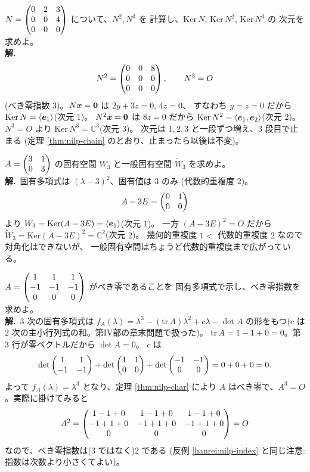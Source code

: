 \begin{rei}[例題・基本(核の増大列)]\label{rei:nilp-chain-ex}
$N = \begin{pmatrix}0 & 2 & 3 \\ 0 & 0 & 4 \\ 0 & 0 & 0\end{pmatrix}$ について、$N^2, N^3$ を
計算し、$\mathrm{Ker}\,N$, $\mathrm{Ker}\,N^2$, $\mathrm{Ker}\,N^3$ の
次元を求めよ。\\
\textbf{解.}\
\[
N^2 = \begin{pmatrix}0 & 0 & 8 \\ 0 & 0 & 0 \\ 0 & 0 & 0\end{pmatrix}, \qquad N^3 = O
\]
(べき零指数 $3$)。$N\bm{x} = \bm{0}$ は $2y + 3z = 0$, $4z = 0$、
すなわち $y = z = 0$ だから
$\mathrm{Ker}\,N = \langle \bm{e}_1 \rangle$(次元 $1$)。
$N^2\bm{x} = \bm{0}$ は $8z = 0$ だから
$\mathrm{Ker}\,N^2 = \langle \bm{e}_1, \bm{e}_2 \rangle$(次元 $2$)。
$N^3 = O$ より $\mathrm{Ker}\,N^3 = \mathbb{C}^3$(次元 $3$)。
次元は $1, 2, 3$ と一段ずつ増え、$3$ 段目で止まる
(定理 \ref{thm:nilp-chain} のとおり、止まったら以後は不変)。
\end{rei}

\begin{rei}[例題・基本(一般固有空間の計算)]\label{rei:nilp-gen2}
$A = \begin{pmatrix}3 & 1 \\ 0 & 3\end{pmatrix}$ の固有空間 $W_3$ と一般固有空間
$\widetilde{W}_3$ を求めよ。\\
\textbf{解.}\ 固有多項式は $(\lambda - 3)^2$、固有値は $3$ のみ
(代数的重複度 $2$)。
\[
A - 3E = \begin{pmatrix}0 & 1 \\ 0 & 0\end{pmatrix}
\]
より $W_3 = \mathrm{Ker}(A - 3E) = \langle \bm{e}_1 \rangle$(次元 $1$)。
一方 $(A - 3E)^2 = O$ だから
$\widetilde{W}_3 = \mathrm{Ker}(A - 3E)^2 = \mathbb{C}^2$(次元 $2$)。
幾何的重複度 $1 <$ 代数的重複度 $2$ なので対角化はできないが、
一般固有空間はちょうど代数的重複度まで広がっている。
\end{rei}

\begin{rei}[例題・標準(固有多項式による判定)]\label{rei:nilp-charpoly}
$A = \begin{pmatrix}1 & 1 & 1 \\ -1 & -1 & -1 \\ 0 & 0 & 0\end{pmatrix}$ がべき零であることを
固有多項式で示し、べき零指数を求めよ。\\
\textbf{解.}\ $3$ 次の固有多項式は
$f_A(\lambda) = \lambda^3 - (\mathrm{tr}\,A)\lambda^2 + c\lambda - \det A$
の形をもつ($c$ は $2$ 次の主小行列式の和。第IV部の章末問題で扱った)。
$\mathrm{tr}\,A = 1 - 1 + 0 = 0$。第 $3$ 行が零ベクトルだから $\det A = 0$。
$c$ は
\[
\det\begin{pmatrix}1 & 1 \\ -1 & -1\end{pmatrix} + \det\begin{pmatrix}1 & 1 \\ 0 & 0\end{pmatrix}
+ \det\begin{pmatrix}-1 & -1 \\ 0 & 0\end{pmatrix} = 0 + 0 + 0 = 0.
\]
よって $f_A(\lambda) = \lambda^3$ となり、定理 \ref{thm:nilp-char} により
$A$ はべき零で、$A^3 = O$。実際に掛けてみると
\[
A^2 = \begin{pmatrix}1 - 1 + 0 & 1 - 1 + 0 & 1 - 1 + 0 \\
-1 + 1 + 0 & -1 + 1 + 0 & -1 + 1 + 0 \\ 0 & 0 & 0\end{pmatrix} = O
\]
なので、べき零指数は($3$ ではなく)$2$ である
(反例 \ref{hanrei:nilp-index} と同じ注意:指数は次数より小さくてよい)。
\end{rei}

